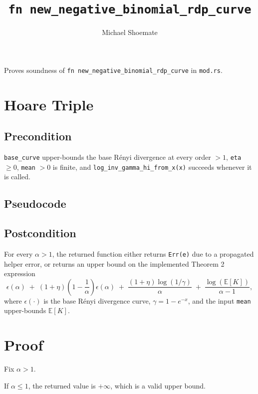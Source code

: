 \documentclass{article}
\title{\texttt{fn new\_negative\_binomial\_rdp\_curve}}
\author{Michael Shoemate}
\begin{document}
\maketitle

Proves soundness of \texttt{fn new\_negative\_binomial\_rdp\_curve} in \texttt{mod.rs}.

\section{Hoare Triple}
\subsection*{Precondition}
\texttt{base\_curve} upper-bounds the base Rényi divergence at every order $> 1$,
\texttt{eta} $\ge 0$, \texttt{mean} $> 0$ is finite, and
\texttt{log\_inv\_gamma\_hi\_from\_x(x)} succeeds whenever it is called.

\subsection*{Pseudocode}


\subsection*{Postcondition}
\begin{theorem}
\label{postcondition}
For every $\alpha > 1$, the returned function either returns \texttt{Err(e)} due to a propagated
helper error, or returns an upper bound on the implemented Theorem 2 expression
\[
\epsilon(\alpha)
\;+\;
(1+\eta)\!\left(1 - \frac{1}{\alpha}\right)\epsilon(\alpha)
\;+\;
\frac{(1+\eta)\log(1/\gamma)}{\alpha}
\;+\;
\frac{\log(\mathbb{E}[K])}{\alpha - 1},
\]
where $\epsilon(\cdot)$ is the base Rényi divergence curve, $\gamma = 1 - e^{-x}$, and the input
\texttt{mean} upper-bounds $\mathbb{E}[K]$.
\end{theorem}

\section{Proof}
Fix $\alpha > 1$.

\begin{lemma}
\label{guard}
If $\alpha \le 1$, the returned value is $+\infty$, which is a valid upper bound.
\end{lemma}
\end{document}
